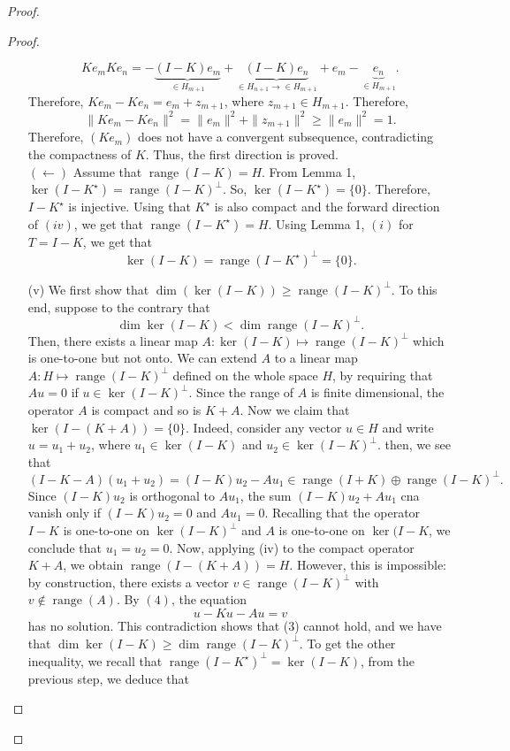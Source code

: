 \documentclass[oneside]{book}
\DeclareMathOperator{\range}{range}
\newcommand{\Ks}{K^{\star}}
\begin{document}
\begin{proof}
\begin{proof}
\begin{enumerate}
\[ Ke_m K e_n = - \underbrace{(I - K) e_m}_{\in H_{m+1}}+ \underbrace{(I - K) e_n}_{\in H_{n+1} \rightarrow \in H_{m+1}} + e_m - \underbrace{e_n}_{\in H_{m+1}}.\]
Therefore, $K e_m - Ke_n = e_m + z_{m + 1}$, where $z_{m + 1} \in H_{m + 1}$. Therefore, 
\[ \| K e_m - K e_n \|^2 = \| e_m \|^2 + \| z_{m + 1}\|^2 \geq \| e_m \|^2 = 1.\]
Therefore, $(Ke_m)$ does not have a convergent subsequence, contradicting the compactness of $K$. Thus, the first direction is proved. \\
\indent $(\leftarrow)$ Assume that $\range(I - K) = H$. From Lemma 1, $\ker(I - \Ks) = \range(I - K)^{\perp}$. So, $\ker(I - \Ks) = \{ 0 \}$. Therefore, $I - \Ks$ is injective. Using that $\Ks$ is also compact and the forward direction of $(iv)$, we get that $\range(I - \Ks) = H$. Using Lemma 1, $(i)$ for $T = I - K$, we get that 
\[ \ker(I - K) = \range(I - \Ks)^{\perp} = \{ 0\}.\]
\item[(v)] We first show that $\dim(\ker(I - K)) \geq \range(I - K)^{\perp}$. To this end, suppose to the contrary that 
\begin{equation}
\dim \ker(I - K) < \dim \range(I - K)^{\perp}.
\end{equation}
Then, there exists a linear map $A: \ker(I - K) \mapsto \range(I - K)^{\perp}$ which is one-to-one but not onto. We can extend $A$ to a linear map $A : H \mapsto \range(I - K)^{\perp}$ defined on the whole space $H$, by requiring that $Au = 0$ if $u \in \ker(I - K)^{\perp}$. Since the range of $A$ is finite dimensional, the operator $A$ is compact and so is $K + A$. Now we claim that $\ker(I - (K + A)) = \{ 0 \}$. Indeed, consider any vector $u \in H$ and write $u = u_1 + u_2$, where $u_1 \in \ker(I - K)$ and $u_2 \in \ker(I - K)^{\perp}$. then, we see that
\begin{equation}
(I - K - A)(u_1 + u_2) = (I - K) u_2 - A u_1 \in \range(I + K) \oplus \range(I - K)^{\perp}.
\end{equation}
Since $(I - K)u_2$ is orthogonal to $A u_1$, the sum $(I - K)u_2 + A u_1$ cna vanish only if $(I - K) u_2 = 0$ and $A u_1 = 0$. Recalling that the operator $I -K$ is one-to-one on $\ker(I -K)^{\perp}$ and $A$ is one-to-one on $\ker(I - K$, we conclude that $u_1 = u_2 = 0$. Now, applying (iv) to the compact operator $K + A$, we obtain $\range(I - (K + A)) = H$. However, this is impossible: by construction, there exists a vector $v \in \range(I - K)^{\perp}$ with $v \not\in \range(A)$. By $(4)$, the equation
\[ u - Ku - Au = v\]
has no solution. This contradiction shows that (3) cannot hold, and we have that $\dim \ker(I - K) \geq \dim \range(I - K)^{\perp}$. To get the other inequality, we recall that $\range(I - \Ks)^{\perp} = \ker(I - K)$, from the previous step, we deduce that 

\end{enumerate}
\end{proof}
\end{proof}
\end{document}
